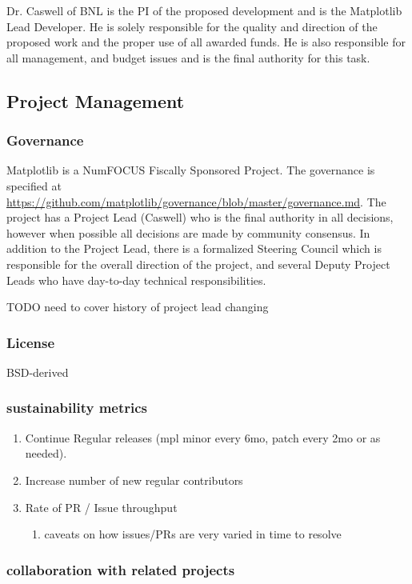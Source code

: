 \documentclass[12pt]{article}
\numberwithin{page}{section}
\begin{document}
Dr. Caswell of BNL is the PI of the proposed development and is the
Matplotlib Lead Developer.  He is solely responsible for the quality
and direction of the proposed work and the proper use of all awarded
funds.  He is also responsible for all management, and budget issues
and is the final authority for this task.


\subsection{Project Management}
\subsubsection{Governance}
Matplotlib is a NumFOCUS Fiscally Sponsored Project.  The governance
is specified at
\url{https://github.com/matplotlib/governance/blob/master/governance.md}.
The project has a Project Lead (Caswell) who is the final authority in
all decisions, however when possible all decisions are made by
community consensus.  In addition to the Project Lead, there is a
formalized Steering Council which is responsible for the overall
direction of the project, and several Deputy Project Leads who have
day-to-day technical responsibilities.

TODO need to cover history of project lead changing

\subsubsection{License}

BSD-derived

\subsubsection{sustainability metrics}
\begin{enumerate}
\item Continue Regular releases (mpl minor every 6mo, patch every 2mo
  or as needed).
\item Increase number of new regular contributors
\item Rate of PR / Issue throughput
  \begin{enumerate}
  \item caveats on how issues/PRs are very varied in time to resolve
  \end{enumerate}
\end{enumerate}

\subsubsection{collaboration with related projects}
\end{document}
